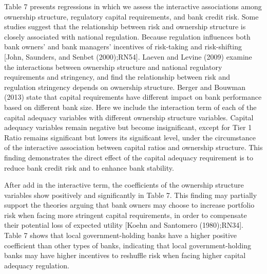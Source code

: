 \documentclass{article}
\begin{document}
Table 7 presents regressions in which we assess the interactive
associations among ownership structure, regulatory capital requirements,
and bank credit risk. Some studies suggest that the relationship between
risk and ownership structure is closely associated with national
regulation. Because regulation influences both bank owners' and bank
managers' incentives of risk-taking and risk-shifting {[}John, Saunders,
and Senbet (2000);RN54{]}. Laeven and Levine (2009) examine the
interactions between ownership structure and national regulatory
requirements and stringency, and find the relationship between risk and
regulation stringency depends on ownership structure. Berger and Bouwman
(2013) state that capital requirements have different impact on bank
performance based on different bank size. Here we include the
interaction term of each of the capital adequacy variables with
different ownership structure variables. Capital adequacy variables
remain negative but become insignificant, except for Tier 1 Ratio
remains significant but lowers its significant level, under the
circumstance of the interactive association between capital ratios and
ownership structure. This finding demonstrates the direct effect of the
capital adequacy requirement is to reduce bank credit risk and to
enhance bank stability.

After add in the interactive term, the coefficients of the ownership
structure variables show positively and significantly in Table 7. This
finding may partially support the theories arguing that bank owners may
choose to increase portfolio risk when facing more stringent capital
requirements, in order to compensate their potential loss of expected
utility {[}Koehn and Santomero (1980);RN34{]}. Table 7 shows that local
government-holding banks have a higher positive coefficient than other
types of banks, indicating that local government-holding banks may have
higher incentives to reshuffle risk when facing higher capital adequacy
regulation.
\end{document}
